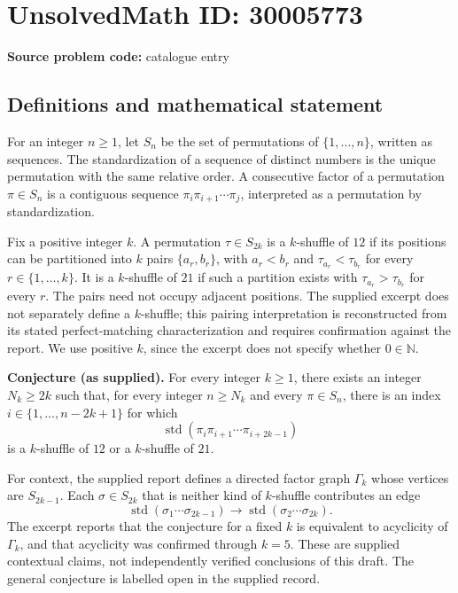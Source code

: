\documentclass[11pt]{article}
\newcommand{\N}{\mathbb{N}}
\begin{document}
\section*{UnsolvedMath ID: 30005773}
\textbf{Source problem code:} catalogue entry
\subsection{Definitions and mathematical statement}
For an integer \(n\geq 1\), let \(S_n\) be the set of permutations of \(\{1,\ldots,n\}\), written as sequences. The standardization of a sequence of distinct numbers is the unique permutation with the same relative order. A consecutive factor of a permutation \(\pi\in S_n\) is a contiguous sequence \(\pi_i\pi_{i+1}\cdots\pi_j\), interpreted as a permutation by standardization.

Fix a positive integer \(k\). A permutation \(\tau\in S_{2k}\) is a \(k\)-shuffle of \(12\) if its positions can be partitioned into \(k\) pairs \(\{a_r,b_r\}\), with \(a_r<b_r\) and \(\tau_{a_r}<\tau_{b_r}\) for every \(r\in\{1,\ldots,k\}\). It is a \(k\)-shuffle of \(21\) if such a partition exists with \(\tau_{a_r}>\tau_{b_r}\) for every \(r\). The pairs need not occupy adjacent positions. The supplied excerpt does not separately define a \(k\)-shuffle; this pairing interpretation is reconstructed from its stated perfect-matching characterization and requires confirmation against the report. We use positive \(k\), since the excerpt does not specify whether \(0\in\N\).

\textbf{Conjecture (as supplied).} For every integer \(k\geq 1\), there exists an integer \(N_k\geq 2k\) such that, for every integer \(n\geq N_k\) and every \(\pi\in S_n\), there is an index \(i\in\{1,\ldots,n-2k+1\}\) for which
\[
\operatorname{std}(\pi_i\pi_{i+1}\cdots\pi_{i+2k-1})
\]
is a \(k\)-shuffle of \(12\) or a \(k\)-shuffle of \(21\).

For context, the supplied report defines a directed factor graph \(\Gamma_k\) whose vertices are \(S_{2k-1}\). Each \(\sigma\in S_{2k}\) that is neither kind of \(k\)-shuffle contributes an edge
\[
\operatorname{std}(\sigma_1\cdots\sigma_{2k-1})
\longrightarrow
\operatorname{std}(\sigma_2\cdots\sigma_{2k}).
\]
The excerpt reports that the conjecture for a fixed \(k\) is equivalent to acyclicity of \(\Gamma_k\), and that acyclicity was confirmed through \(k=5\). These are supplied contextual claims, not independently verified conclusions of this draft. The general conjecture is labelled open in the supplied record.
\end{document}
